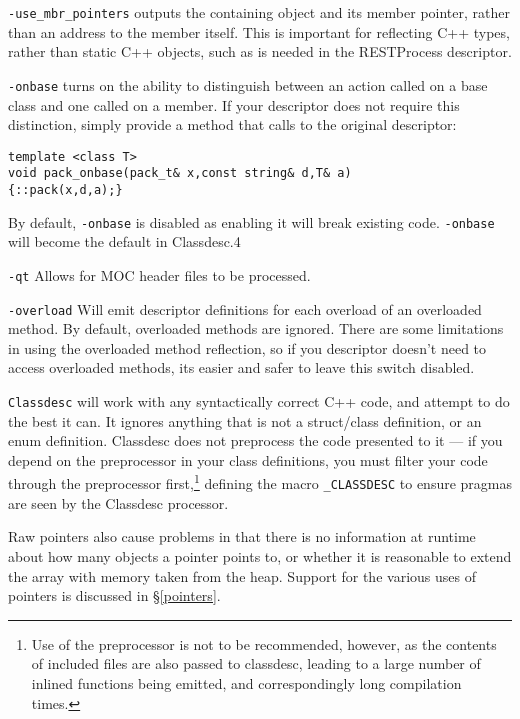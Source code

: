 \verb+-use_mbr_pointers+ outputs the containing object and its member
pointer, rather than an address to the member itself. This is
important for reflecting C++ types, rather than static C++ objects,
such as is needed in the RESTProcess descriptor.

\verb+-onbase+ turns on the ability to distinguish between an action
called on a base class and one called on a member. If your descriptor
does not require this distinction, simply provide a method that calls
to the original descriptor:
\begin{verbatim}
template <class T>
void pack_onbase(pack_t& x,const string& d,T& a)
{::pack(x,d,a);}
\end{verbatim} 
By default, \verb+-onbase+ is disabled as enabling it will break existing
code. \verb+-onbase+ will become the default in Classdesc.4

\verb+-qt+ Allows for MOC header files to be processed.

\verb+-overload+ Will emit descriptor definitions for each overload of
an overloaded method. By default, overloaded methods are ignored.
There are some limitations in using the overloaded method reflection,
so if you descriptor doesn't need to access overloaded methods, its
easier and safer to leave this switch disabled.


{\tt Classdesc} will work with any syntactically correct C++ code, and
attempt to do the best it can. It ignores anything that is not a
struct/class definition, or an enum definition. Classdesc
does not preprocess the code presented to it --- if you depend on the
preprocessor in your class definitions, you must filter your code
through the preprocessor first,\footnote{Use of
the preprocessor is not to be recommended, however, as the contents of
included files are also passed to classdesc, leading to a large number
of inlined functions being emitted, and correspondingly long
compilation times.} defining the macro
\verb+_CLASSDESC+ to ensure pragmas are seen by the
Classdesc processor.

Raw pointers also cause problems in that there is no information at
runtime about how many objects a pointer points to, or whether it is reasonable
to extend the array with memory taken from the heap. Support for the
various uses of pointers is discussed in \S\ref{pointers}.

